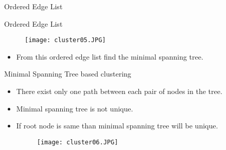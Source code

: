 \begin{frame}{Ordered Edge List}
\begin{figure}[!h]
\end{figure}
\end{frame}




\begin{frame}{Ordered Edge List}
\begin{figure}
\texttt{[image: cluster05.JPG]}
\end{figure}
\begin{itemize}
\item From this ordered edge list find the minimal spanning tree.
\end{itemize}
\end{frame}

\begin{frame}{Minimal Spanning Tree based clustering}
\begin{itemize}
\item There exist only one path between each pair of nodes in the tree.
\item Minimal spanning tree is not unique.
\item If root node is same than minimal spanning tree will be unique.
\begin{figure}
\texttt{[image: cluster06.JPG]}
\end{figure}
\end{itemize}
\end{frame}

